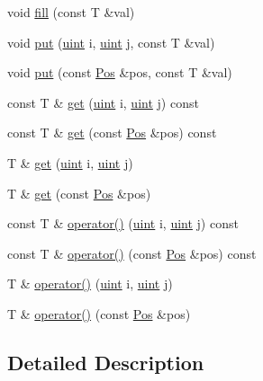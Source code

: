 \begin{DoxyCompactItemize}
void \hyperlink{class_c_y_k_table_ae170769ead1b09dc504803aab6bb5023}{fill} (const T \&val)
\item 
void \hyperlink{class_c_y_k_table_a5cc925d718856e222bb34aa49776c0cb}{put} (\hyperlink{cyktable_8h_a91ad9478d81a7aaf2593e8d9c3d06a14}{uint} i, \hyperlink{cyktable_8h_a91ad9478d81a7aaf2593e8d9c3d06a14}{uint} j, const T \&val)
\item 
void \hyperlink{class_c_y_k_table_af2a184bbe308fe59b8f8e0c08819ac8e}{put} (const \hyperlink{cyktable_8h_a7e9574c432ee134e818aee14852c4532}{Pos} \&pos, const T \&val)
\item 
const T \& \hyperlink{class_c_y_k_table_a512c868395342a2317adcd9bf334bf05}{get} (\hyperlink{cyktable_8h_a91ad9478d81a7aaf2593e8d9c3d06a14}{uint} i, \hyperlink{cyktable_8h_a91ad9478d81a7aaf2593e8d9c3d06a14}{uint} j) const 
\item 
const T \& \hyperlink{class_c_y_k_table_a7a58d79459d2b1f49e8d27e847c3ffd5}{get} (const \hyperlink{cyktable_8h_a7e9574c432ee134e818aee14852c4532}{Pos} \&pos) const 
\item 
T \& \hyperlink{class_c_y_k_table_a1c7e159574311ea59aa25891daa3c745}{get} (\hyperlink{cyktable_8h_a91ad9478d81a7aaf2593e8d9c3d06a14}{uint} i, \hyperlink{cyktable_8h_a91ad9478d81a7aaf2593e8d9c3d06a14}{uint} j)
\item 
T \& \hyperlink{class_c_y_k_table_a41b444512bf9af6f583322cc6f1e933e}{get} (const \hyperlink{cyktable_8h_a7e9574c432ee134e818aee14852c4532}{Pos} \&pos)
\item 
const T \& \hyperlink{class_c_y_k_table_a6690bdb72d2fa0a6a504c2aead843a22}{operator()} (\hyperlink{cyktable_8h_a91ad9478d81a7aaf2593e8d9c3d06a14}{uint} i, \hyperlink{cyktable_8h_a91ad9478d81a7aaf2593e8d9c3d06a14}{uint} j) const 
\item 
const T \& \hyperlink{class_c_y_k_table_aa922f21c12edf59ff8da637ad4d6c646}{operator()} (const \hyperlink{cyktable_8h_a7e9574c432ee134e818aee14852c4532}{Pos} \&pos) const 
\item 
T \& \hyperlink{class_c_y_k_table_a3ec3e00e3a1159630bf1390d3a09e8f7}{operator()} (\hyperlink{cyktable_8h_a91ad9478d81a7aaf2593e8d9c3d06a14}{uint} i, \hyperlink{cyktable_8h_a91ad9478d81a7aaf2593e8d9c3d06a14}{uint} j)
\item 
T \& \hyperlink{class_c_y_k_table_a15dcf3e14b7306640328c613512a73b0}{operator()} (const \hyperlink{cyktable_8h_a7e9574c432ee134e818aee14852c4532}{Pos} \&pos)
\end{DoxyCompactItemize}


\subsection{Detailed Description}
